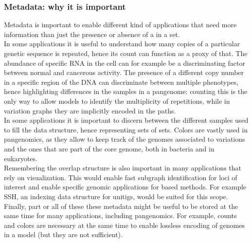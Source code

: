 \subsubsection{Metadata: why it is important}
Metadata is important to enable different kind of applications that need more information than just the presence or absence of a \kmer in a set. \\
In some applications it is useful to understand how many copies of a particular genetic sequence is repeated, hence its \kmer count can function as a proxy of that. The abundance of specific RNA in the cell can for example be a discriminating factor between normal and cancerous activity. The presence of a different copy number in a specific region of the DNA can discriminate between multiple phenotypes, hence highlighting differences in the samples in a pangenome: counting \kmers this is the only way to allow \dbg models to identify the multiplicity of repetitions, while in variation graphs they are implicitly encoded in the paths.\\
In some applications it is important to discern between the different samples used to fill the data structure, hence representing sets of \kmer sets. Colors are vastly used in pangenomics, as they allow to keep track of the genomes associated to variations and the ones that are part of the core genome, both in bacteria and in eukaryotes.\\
Remembering the \dbg overlap structure is also important in many applications that rely on visualization. This would enable fast subgraph identification for loci of interest and enable specific genomic applications for \dbg based methods. For example SSH, an indexing data structure for unitigs, would be suited for this scope.\\
Finally, part or all of these these metadata might be useful to be stored at the same time for many applications, including pangenomics. For example, \kmer counts and colors are necessary at the same time to enable lossless encoding of genomes in a \dbg model (but they are not sufficient).

